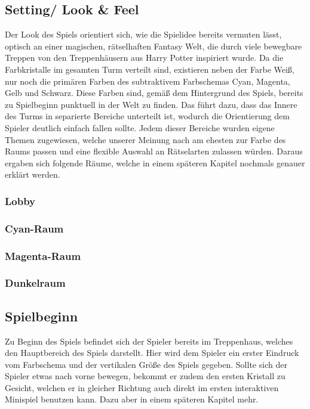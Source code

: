 \subsection{Setting/ Look \& Feel}
Der Look des Spiels orientiert sich, wie die Spielidee bereits vermuten lässt, optisch an einer magischen, rätselhaften Fantasy Welt, die durch viele bewegbare Treppen von den Treppenhäusern aus Harry Potter inspiriert wurde. Da die Farbkristalle im gesamten Turm verteilt sind, existieren neben der Farbe Weiß, nur noch die primären Farben des subtraktivem Farbschemas Cyan, Magenta, Gelb und Schwarz. Diese Farben sind, gemäß dem Hintergrund des Spiels, bereits zu Spielbeginn punktuell in der Welt zu finden. Das führt dazu, dass das Innere des Turms in separierte Bereiche unterteilt ist, wodurch die Orientierung dem Spieler deutlich einfach fallen sollte. Jedem dieser Bereiche wurden eigene Themen zugewiesen, welche unserer Meinung nach am ehesten zur Farbe des Raums passen und eine flexible Auswahl an Rätselarten zulassen würden. Daraus ergaben sich folgende Räume, welche in einem späteren Kapitel nochmals genauer erklärt werden.
\subsubsection{Lobby}
\subsubsection{Cyan-Raum}
\subsubsection{Magenta-Raum}
\subsubsection{Dunkelraum}

\newpage
\noindent
\subsection{Spielbeginn}
Zu Beginn des Spiels befindet sich der Spieler bereits im Treppenhaus, welches den Hauptbereich des Spiels darstellt. Hier wird dem Spieler ein erster Eindruck vom Farbschema und der vertikalen Größe des Spiels gegeben. Sollte sich der Spieler etwas nach vorne bewegen, bekommt er zudem den ersten Kristall zu Gesicht, welchen er in gleicher Richtung auch direkt im ersten interaktiven Minispiel benutzen kann. Dazu aber in einem späteren Kapitel mehr.\\
